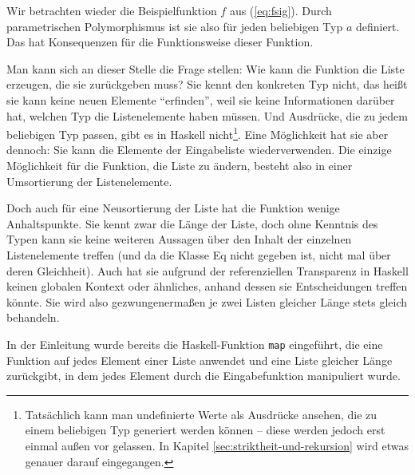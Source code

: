 Wir betrachten wieder die Beispielfunktion $f$ aus (\ref{eq:fsig}). Durch parametrischen Polymorphismus ist sie also für jeden beliebigen
Typ $a$ definiert. Das hat Konsequenzen für die Funktionsweise dieser Funktion.

Man kann sich an dieser Stelle die Frage stellen: Wie kann die Funktion die Liste erzeugen, die sie zurückgeben muss? Sie kennt den konkreten Typ nicht,
das heißt sie kann keine neuen Elemente ``erfinden'', weil sie keine Informationen darüber hat, welchen Typ die Listenelemente haben müssen.
Und Ausdrücke, die zu jedem beliebigen Typ passen, gibt es in Haskell
nicht\footnote{Tatsächlich kann man undefinierte Werte als Ausdrücke ansehen, die zu einem beliebigen Typ generiert werden können --
diese werden jedoch erst einmal außen vor gelassen. In Kapitel \ref{sec:striktheit-und-rekursion} wird etwas genauer darauf eingegangen.}.
Eine Möglichkeit hat sie aber dennoch: Sie kann die Elemente der Eingabeliste wiederverwenden.
Die einzige Möglichkeit für die Funktion, die Liste zu ändern, besteht also in einer Umsortierung der Listenelemente.

Doch auch für eine Neusortierung der Liste hat die Funktion wenige Anhaltspunkte. Sie kennt zwar die Länge der Liste, doch ohne Kenntnis des Typen kann sie keine weiteren Aussagen über den Inhalt der einzelnen Listenelemente treffen (und da die Klasse Eq
nicht gegeben ist, nicht mal über deren Gleichheit). Auch hat sie aufgrund der referenziellen Transparenz %
in Haskell keinen globalen Kontext oder ähnliches, anhand dessen sie Entscheidungen treffen könnte.
Sie wird also gezwungenermaßen je zwei Listen gleicher Länge stets gleich behandeln.

In der Einleitung wurde bereits die Haskell-Funktion \texttt{map} eingeführt, die eine Funktion auf jedes Element einer Liste
anwendet und eine Liste gleicher Länge zurückgibt, in dem jedes Element durch die Eingabefunktion manipuliert wurde.


